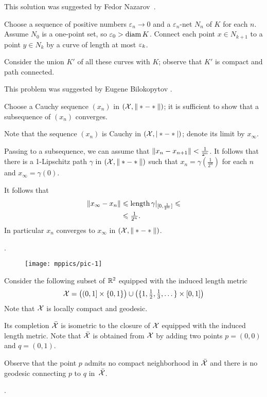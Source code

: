 This solution was suggested by Fedor Nazarov~\cite{nazarov}.

Choose a sequence of positive numbers $\varepsilon_n\to 0$ and a $\varepsilon_n$-net $N_n$ of $K$ for each $n$.
Assume $N_0$ is a one-point set, so $\varepsilon_0>\operatorname{\rm diam}\nolimits K$.
Connect each point $x\in N_{k+1}$ to a point $y\in N_{k}$ by a curve of length at most $\varepsilon_k$.

Consider the union $K'$ of all these curves with $K$; observe that $K'$ is compact and path connected.

 This problem was suggested by Eugene Bilokopytov \cite{bilokopytov}.

Choose a Cauchy sequence $(x_n)$ in $(\mathcal{X},\|*-*\|)$; it is sufficient to show that a subsequence of $(x_n)$ converges.

Note that the sequence $(x_n)$ is Cauchy in $(\mathcal{X},|*-*|)$;
denote its limit by $x_\infty$.

Passing to a subsequence, we can assume that $\|x_n-x_{n+1}\|\z<\tfrac1{2^n}$.
It follows that there is a 1-Lipschitz path $\gamma$ in $(\mathcal{X},\|*-*\|)$ such that $x_n=\gamma(\tfrac1{2^n})$ for each $n$ and $x_\infty=\gamma(0)$.

It follows that
\begin{align*}
\|x_\infty-x_n\|&\leqslant \mathop{\rm length}\nolimits\gamma|_{[0,\frac1{2^n}]}\leqslant
\\
&\leqslant \tfrac1{2^n}.
\end{align*}
In particular $x_n$ converges to $x_\infty$ in $(\mathcal{X},\|*-*\|)$.

 \cite[Lemma 2.3]{petrunin-stadler}.


\begin{wrapfigure}{r}{20 mm}
\vskip-5mm
\centering
\texttt{[image: mppics/pic-1]}
\end{wrapfigure}

Consider the following subset of $\mathbb{R}^2$ equipped with the induced length metric
\[
\mathcal{X}
=
\bigl((0,1]\times\{0,1\}\bigr)
\cup
\bigl(\{1,\tfrac12,\tfrac13,\dots\}\times[0,1]\bigr)
\]
Note that $\mathcal{X}$ is locally compact and geodesic.

Its completion $\bar{\mathcal{X}}$ is isometric to the closure of $\mathcal{X}$ equipped with the induced length metric.
Note that $\bar{\mathcal{X}}$ is obtained from $\mathcal{X}$ by adding two points $p=(0,0)$ and $q=(0,1)$.

Observe that the point $p$ admits no compact neighborhood in $\bar{\mathcal{X}}$ 
and there is no geodesic connecting $p$ to $q$ in~$\bar{\mathcal{X}}$. 

 \cite[I.3.6(4)]{bridson-haefliger}.

